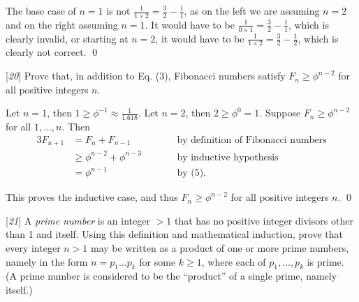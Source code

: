 \sol The base case of $n=1$ is not $\frac{1}{1\times 2} = \frac{3}{2} - \frac{1}{1}$, as on the left we are assuming $n=2$ and on the right assuming $n=1$. It would have to be $\frac{1}{0\times 1} = \frac{3}{2} - \frac{1}{1}$, which is clearly invalid, or starting at $n=2$, it would have to be $\frac{1}{1 \times 2} = \frac{3}{2} - \frac{1}{2}$, which is clearly not correct. \qed

 [\textit{20}] Prove that, in addition to Eq. (3), Fibonacci numbers satisfy $F_n \geq \phi^{n-2}$ for all positive integers $n$.

\pf Let $n = 1$, then $1 \geq \phi^{-1} \approx \frac{1}{1.618}$. Let $n=2$, then $2 \geq \phi^{0} = 1$. Suppose $F_n \geq \phi^{n-2}$ for all $1, \dots, n$. Then 
\begin{alignat*}{3}
    F_{n+1} &= F_{n} + F_{n-1} &&\text{by definition of Fibonacci numbers}\\
    &\geq \phi^{n-2} + \phi^{n-3} \qquad &&\text{by inductive hypothesis}\\
    &= \phi^{n-1} \qquad &&\text{by (5).}
\end{alignat*}

This proves the inductive case, and thus $F_n \geq \phi^{n-2}$ for all positive integers $n$. \qed

 [\textit{21}] A \textit{prime number} is an integer $> 1$ that has no positive integer divisors other than 1 and itself. Using this definition and mathematical induction, prove that every integer $n>1$ may be written as a product of one or more prime numbers, namely in the form $n = p_1 \dots p_k$ for some $k \geq 1$, where each of $p_1, \dots, p_k$ is prime. (A prime number is considered to be the ``product'' of a single prime, namely itself.)

\pf 
